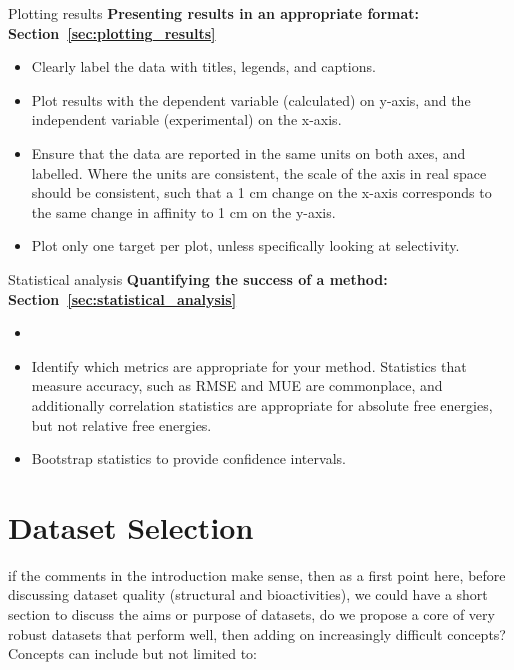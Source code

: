\documentclass[9pt,bestpractices]{livecoms}
\begin{document}
\begin{Checklists*}


\begin{checklist}{Plotting results}
\textbf{Presenting results in an appropriate format: Section~\ref{sec:plotting_results}}
\begin{itemize}
\item Clearly label the data with titles, legends, and captions.
\item Plot results with the dependent variable (calculated) on y-axis, and the independent variable (experimental) on the x-axis. 
\item Ensure that the data are reported in the same units on both axes, and labelled. Where the units are consistent, the scale of the axis in real space should be consistent, such that a 1 cm change on the x-axis corresponds to the same change in affinity to 1 cm on the y-axis.
\item Plot only one target per plot, unless specifically looking at selectivity.
\end{itemize}
\end{checklist}

\begin{checklist}{Statistical analysis}
\textbf{Quantifying the success of a method: Section~\ref{sec:statistical_analysis}}
\begin{itemize}
\item 
\item Identify which metrics are appropriate for your method. Statistics that measure accuracy, such as RMSE and MUE are commonplace, and additionally correlation statistics are appropriate for absolute free energies, but not relative free energies.
\item Bootstrap statistics to provide confidence intervals. 
\end{itemize}
\end{checklist}


\end{Checklists*}






\section{Dataset Selection}

if the comments in the introduction make sense, then as a first point here, before discussing dataset quality (structural and bioactivities), we could have a short section to discuss the aims or purpose of datasets, do we propose a core of very robust datasets that perform well, then adding on increasingly difficult concepts? Concepts can include but not limited to:
\end{document}
